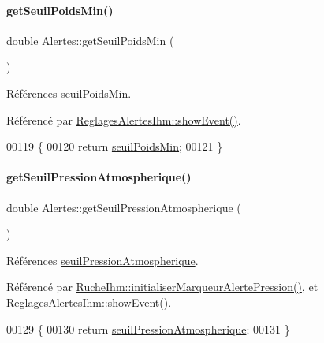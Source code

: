 \paragraph{\texorpdfstring{get\+Seuil\+Poids\+Min()}{getSeuilPoidsMin()}}
{\footnotesize\ttfamily double Alertes\+::get\+Seuil\+Poids\+Min (\begin{DoxyParamCaption}{ }\end{DoxyParamCaption})}



Références \hyperlink{class_alertes_a3f23bee8122888916e33559f4d0bf34b}{seuil\+Poids\+Min}.



Référencé par \hyperlink{class_reglages_alertes_ihm_af47504b34ab0213fce9269c08b9e5544}{Reglages\+Alertes\+Ihm\+::show\+Event()}.


\begin{DoxyCode}
00119 \{
00120     \textcolor{keywordflow}{return} \hyperlink{class_alertes_a3f23bee8122888916e33559f4d0bf34b}{seuilPoidsMin};
00121 \}
\end{DoxyCode}
\mbox{\label{class_alertes_a502fa36037246fb6eaad1db859bc1971}} 
\paragraph{\texorpdfstring{get\+Seuil\+Pression\+Atmospherique()}{getSeuilPressionAtmospherique()}}
{\footnotesize\ttfamily double Alertes\+::get\+Seuil\+Pression\+Atmospherique (\begin{DoxyParamCaption}{ }\end{DoxyParamCaption})}



Références \hyperlink{class_alertes_a565094789ef5eb0ae2a2a562ee8a9704}{seuil\+Pression\+Atmospherique}.



Référencé par \hyperlink{class_ruche_ihm_a87e4e8d783ea0f15d6304ed604c7ddaa}{Ruche\+Ihm\+::initialiser\+Marqueur\+Alerte\+Pression()}, et \hyperlink{class_reglages_alertes_ihm_af47504b34ab0213fce9269c08b9e5544}{Reglages\+Alertes\+Ihm\+::show\+Event()}.


\begin{DoxyCode}
00129 \{
00130     \textcolor{keywordflow}{return} \hyperlink{class_alertes_a565094789ef5eb0ae2a2a562ee8a9704}{seuilPressionAtmospherique};
00131 \}
\end{DoxyCode}
\mbox{\label{class_alertes_a00d834877e1fc34d7e0659ef6963ac4f}} 
